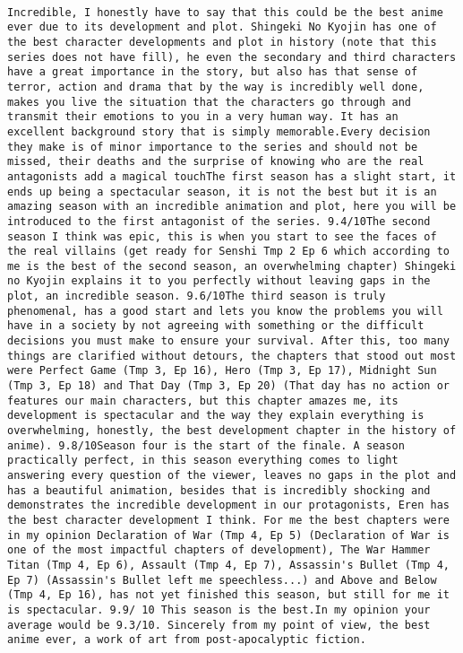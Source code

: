\documentclass[
]{article}
\begin{document}
\begin{verbatim}
                                                                                                                                                                                                                                                Incredible, I honestly have to say that this could be the best anime ever due to its development and plot. Shingeki No Kyojin has one of the best character developments and plot in history (note that this series does not have fill), he even the secondary and third characters have a great importance in the story, but also has that sense of terror, action and drama that by the way is incredibly well done, makes you live the situation that the characters go through and transmit their emotions to you in a very human way. It has an excellent background story that is simply memorable.Every decision they make is of minor importance to the series and should not be missed, their deaths and the surprise of knowing who are the real antagonists add a magical touchThe first season has a slight start, it ends up being a spectacular season, it is not the best but it is an amazing season with an incredible animation and plot, here you will be introduced to the first antagonist of the series. 9.4/10The second season I think was epic, this is when you start to see the faces of the real villains (get ready for Senshi Tmp 2 Ep 6 which according to me is the best of the second season, an overwhelming chapter) Shingeki no Kyojin explains it to you perfectly without leaving gaps in the plot, an incredible season. 9.6/10The third season is truly phenomenal, has a good start and lets you know the problems you will have in a society by not agreeing with something or the difficult decisions you must make to ensure your survival. After this, too many things are clarified without detours, the chapters that stood out most were Perfect Game (Tmp 3, Ep 16), Hero (Tmp 3, Ep 17), Midnight Sun (Tmp 3, Ep 18) and That Day (Tmp 3, Ep 20) (That day has no action or features our main characters, but this chapter amazes me, its development is spectacular and the way they explain everything is overwhelming, honestly, the best development chapter in the history of anime). 9.8/10Season four is the start of the finale. A season practically perfect, in this season everything comes to light answering every question of the viewer, leaves no gaps in the plot and has a beautiful animation, besides that is incredibly shocking and demonstrates the incredible development in our protagonists, Eren has the best character development I think. For me the best chapters were in my opinion Declaration of War (Tmp 4, Ep 5) (Declaration of War is one of the most impactful chapters of development), The War Hammer Titan (Tmp 4, Ep 6), Assault (Tmp 4, Ep 7), Assassin's Bullet (Tmp 4, Ep 7) (Assassin's Bullet left me speechless...) and Above and Below (Tmp 4, Ep 16), has not yet finished this season, but still for me it is spectacular. 9.9/ 10 This season is the best.In my opinion your average would be 9.3/10. Sincerely from my point of view, the best anime ever, a work of art from post-apocalyptic fiction.

\end{verbatim}
\end{document}
